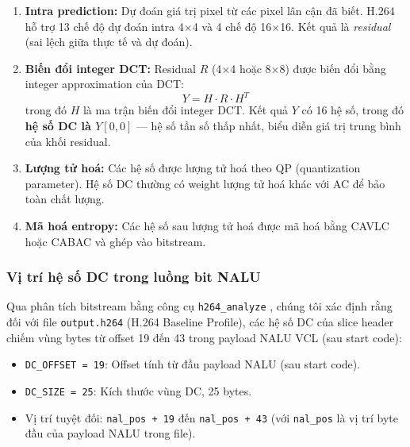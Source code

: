 \begin{enumerate}
  \item \textbf{Intra prediction:} Dự đoán giá trị pixel từ các pixel lân cận đã biết.
        H.264 hỗ trợ 13 chế độ dự đoán intra 4$\times$4 và 4 chế độ 16$\times$16.
        Kết quả là \emph{residual} (sai lệch giữa thực tế và dự đoán).

  \item \textbf{Biến đổi integer DCT:} Residual $R$ (4$\times$4 hoặc 8$\times$8) được
        biến đổi bằng integer approximation của DCT:
        \begin{equation}
        Y = H \cdot R \cdot H^T
        \end{equation}
        trong đó $H$ là ma trận biến đổi integer DCT. Kết quả $Y$ có 16 hệ số,
        trong đó \textbf{hệ số DC là $Y[0,0]$} --- hệ số tần số thấp nhất,
        biểu diễn giá trị trung bình của khối residual.

  \item \textbf{Lượng tử hoá:} Các hệ số được lượng tử hoá theo QP (quantization parameter).
        Hệ số DC thường có weight lượng tử hoá khác với AC để bảo toàn chất lượng.

  \item \textbf{Mã hoá entropy:} Các hệ số sau lượng tử hoá được mã hoá bằng CAVLC
        hoặc CABAC và ghép vào bitstream.
\end{enumerate}

\subsubsection{Vị trí hệ số DC trong luồng bit NALU}

Qua phân tích bitstream bằng công cụ \texttt{h264\_analyze} \cite{h264bitstream},
chúng tôi xác định rằng đối với file \texttt{output.h264} (H.264 Baseline Profile),
các hệ số DC của slice header chiếm vùng bytes từ offset 19 đến 43 trong payload
NALU VCL (sau start code):

\begin{itemize}
  \item \texttt{DC\_OFFSET = 19}: Offset tính từ đầu payload NALU (sau start code).
  \item \texttt{DC\_SIZE = 25}: Kích thước vùng DC, 25 bytes.
  \item Vị trí tuyệt đối: \texttt{nal\_pos + 19} đến \texttt{nal\_pos + 43}
        (với \texttt{nal\_pos} là vị trí byte đầu của payload NALU trong file).
\end{itemize}

